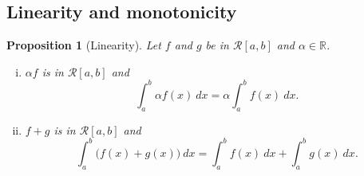 \documentclass[12pt]{book}
\newcommand{\R}{{\mathbb{R}}}
\newcommand{\sR}{{\mathcal{R}}}
\theoremstyle{plain}
\newtheorem{prop}[thm]{Proposition}
\theoremstyle{remark}
\theoremstyle{definition}
\theoremstyle{exercise}
\theoremstyle{example}
\begin{document}
\subsection{Linearity and monotonicity}

\begin{prop}[Linearity]
Let $f$ and $g$ be in $\sR[a,b]$ and $\alpha \in \R$.
\begin{enumerate}[(i)]
\item $\alpha f$ is in $\sR[a,b]$ and
\begin{equation*}
\int_a^b \alpha f(x) ~dx = \alpha \int_a^b f(x) ~dx .
\end{equation*}
\item $f+g$ is in $\sR[a,b]$ and
\begin{equation*}
\int_a^b \bigl( f(x)+g(x) \bigr) ~dx = 
\int_a^b f(x) ~dx 
+
\int_a^b g(x) ~dx .
\end{equation*}
\end{enumerate}
\end{prop}
\end{document}
